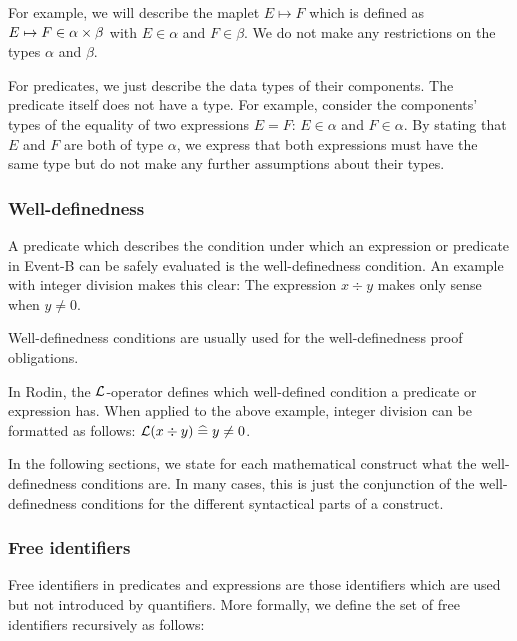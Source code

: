 For example, we will describe the maplet $E\mapsto F$ which is defined as $E\mapsto F\in\alpha\mathbin\times\beta$ with
 $E\in\alpha$ and $F\in\beta$. We do not make any restrictions on the types $\alpha$ and $\beta$.

For predicates, we just describe the data types of their components. 
The predicate itself does not have a type.
For example, consider the components' types of the equality of two expressions $E=F$: $E\in\alpha$ and $F\in\alpha$.
By stating that $E$ and $F$ are both of type $\alpha$, we express that both expressions must have the
  same type but do not make any further assumptions about their types.

\subsubsection{Well-definedness}
\label{well_definedness}

A predicate which describes the condition under which an expression or predicate in Event-B can be safely evaluated is the well-definedness condition.
An example with integer division makes this clear: The expression $x\div y$ makes only sense when $y\neq 0$.

Well-definedness conditions are usually used for the well-definedness proof obligations.

In Rodin, the $\mathcal{L}$-operator defines which well-defined condition a predicate or expression has.
When applied to the above example, integer division can be formatted as follows: $\mathcal{L}(x\div y) \mathrel{\widehat=} y\neq 0$.

In the following sections, we state for each mathematical construct what the well-definedness conditions are.
In many cases, this is just the conjunction of the well-definedness conditions for the different syntactical parts of a construct.

\subsubsection{Free identifiers}
\label{free_identifiers}
Free identifiers in predicates and expressions are those identifiers which are used but not introduced by quantifiers.
More formally, we define the set of free identifiers \freeids{} recursively as follows:

